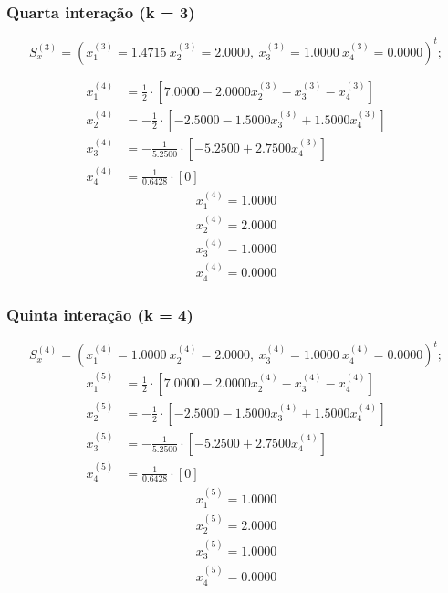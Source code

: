 \documentclass[12pt,a4paper]{article}
\begin{document}
            \subsubsection{Quarta interação (k = 3)}

                \[
                S_x^{(3)} = (x_1^{(3)} = 1.4715\ x_2^{(3)}= 2.0000,\ x_3^{(3)}= 1.0000\ x_4^{(3)}= 0.0000)^t;
                \]

                \begin{align*}
                    x_1^{(4)} &= \frac{1}{2} \cdot [7.0000 - 2.0000x_2^{(3)} - x_3^{(3)} - x_4^{(3)}]\\
                    x_2^{(4)} &= -\frac{1}{2} \cdot [-2.5000 - 1.5000x_3^{(3)} + 1.5000x_4^{(3)}]\\
                    x_3^{(4)} &= -\frac{1}{5.2500} \cdot [-5.2500 + 2.7500x_4^{(3)}]\\
                    x_4^{(4)} &= \frac{1}{0.6428} \cdot [0]
                \end{align*}
                \begin{align*}
                    x_1^{(4)} = 1.0000\\ x_2^{(4)}= 2.0000\\ x_3^{(4)}= 1.0000\\ x_4^{(4)}= 0.0000
                \end{align*}

            \subsubsection{Quinta interação (k = 4)}

                \[
                S_x^{(4)} = (x_1^{(4)} = 1.0000\ x_2^{(4)}= 2.0000,\ x_3^{(4)}= 1.0000\ x_4^{(4)}= 0.0000)^t;
                \]
                \begin{align*}
                    x_1^{(5)} &= \frac{1}{2} \cdot [7.0000 - 2.0000x_2^{(4)} - x_3^{(4)} - x_4^{(4)}]\\
                    x_2^{(5)} &= -\frac{1}{2} \cdot [-2.5000 - 1.5000x_3^{(4)} + 1.5000x_4^{(4)}]\\
                    x_3^{(5)} &= -\frac{1}{5.2500} \cdot [-5.2500 + 2.7500x_4^{(4)}]\\
                    x_4^{(5)} &= \frac{1}{0.6428} \cdot [0]
                \end{align*}
                \begin{align*}
                    x_1^{(5)} = 1.0000\\ x_2^{(5)}= 2.0000\\ x_3^{(5)}= 1.0000\\ x_4^{(5)}= 0.0000
                \end{align*}
\end{document}
